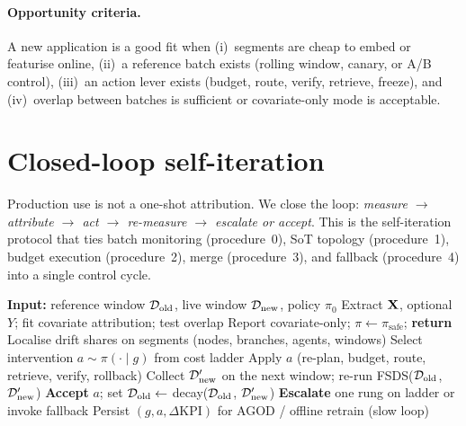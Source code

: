 \paragraph{Opportunity criteria.} A new application is a good fit when
(i)~segments are cheap to embed or featurise online,
(ii)~a reference batch exists (rolling window, canary, or A/B control),
(iii)~an action lever exists (budget, route, verify, retrieve, freeze), and
(iv)~overlap between batches is sufficient or covariate-only mode is acceptable.

\section{Closed-loop self-iteration}
\label{sec:closed-loop}

Production use is not a one-shot attribution. We close the loop: \emph{measure
$\to$ attribute $\to$ act $\to$ re-measure $\to$ escalate or accept}. This is the
self-iteration protocol that ties batch monitoring (procedure~0), SoT topology
(procedure~1), budget execution (procedure~2), merge (procedure~3), and fallback
(procedure~4) into a single control cycle.

\begin{algorithm}[t]
\caption{FSDS closed-loop iteration (per traffic window)}
\label{alg:closed-loop}
\begin{algorithmic}[1]
\STATE \textbf{Input:} reference window $\mathcal{D}_{\mathrm{old}}$, live window $\mathcal{D}_{\mathrm{new}}$, policy $\pi_0$
\STATE Extract $\mathbf{X}$, optional $Y$; fit covariate attribution; test overlap
  \STATE Report covariate-only; $\pi \leftarrow \pi_{\mathrm{safe}}$; \textbf{return}
\ENDIF
\STATE Localise drift shares on segments (nodes, branches, agents, windows)
\STATE Select intervention $a \sim \pi(\cdot \mid g)$ from cost ladder
\STATE Apply $a$ (re-plan, budget, route, retrieve, verify, rollback)
\STATE Collect $\mathcal{D}_{\mathrm{new}}'$ on the next window; re-run FSDS($\mathcal{D}_{\mathrm{old}}$, $\mathcal{D}_{\mathrm{new}}'$)
  \STATE \textbf{Accept} $a$; set $\mathcal{D}_{\mathrm{old}} \leftarrow$ decay($\mathcal{D}_{\mathrm{old}}$, $\mathcal{D}_{\mathrm{new}}'$)
\ELSE
  \STATE \textbf{Escalate} one rung on ladder or invoke fallback
\ENDIF
\STATE Persist $(g, a, \Delta\mathrm{KPI})$ for AGOD / offline retrain (slow loop)
\end{algorithmic}
\end{algorithm}

